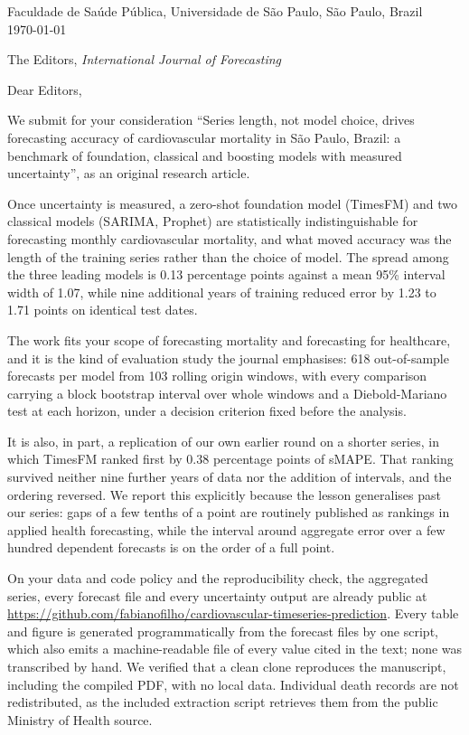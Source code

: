 \documentclass[11pt]{article}
\begin{document}
\noindent
Faculdade de Sa\'ude P\'ublica, Universidade de S\~ao Paulo, S\~ao Paulo, Brazil \\
\today

\vspace{1em}
\noindent
The Editors, \emph{International Journal of Forecasting}

\vspace{1em}

\noindent Dear Editors,

\vspace{0.6em}

We submit for your consideration ``Series length, not model choice, drives forecasting
accuracy of cardiovascular mortality in S\~ao Paulo, Brazil: a benchmark of foundation,
classical and boosting models with measured uncertainty'', as an original research article.

Once uncertainty is measured, a zero-shot foundation model (TimesFM) and two classical
models (SARIMA, Prophet) are statistically indistinguishable for forecasting monthly
cardiovascular mortality, and what moved accuracy was the length of the training series
rather than the choice of model. The spread among the three leading models is 0.13
percentage points against a mean 95\% interval width of 1.07, while nine additional years
of training reduced error by 1.23 to 1.71 points on identical test dates.

The work fits your scope of forecasting mortality and forecasting for healthcare, and it is
the kind of evaluation study the journal emphasises: 618 out-of-sample forecasts per model
from 103 rolling origin windows, with every comparison carrying a block bootstrap interval
over whole windows and a Diebold-Mariano test at each horizon, under a decision criterion
fixed before the analysis.

It is also, in part, a replication of our own earlier round on a shorter series, in which
TimesFM ranked first by 0.38 percentage points of sMAPE. That ranking survived neither nine
further years of data nor the addition of intervals, and the ordering reversed. We report
this explicitly because the lesson generalises past our series: gaps of a few tenths of a
point are routinely published as rankings in applied health forecasting, while the interval
around aggregate error over a few hundred dependent forecasts is on the order of a full
point.

On your data and code policy and the reproducibility check, the aggregated series, every
forecast file and every uncertainty output are already public at
\url{https://github.com/fabianofilho/cardiovascular-timeseries-prediction}. Every table and
figure is generated programmatically from the forecast files by one script, which also
emits a machine-readable file of every value cited in the text; none was transcribed by
hand. We verified that a clean clone reproduces the manuscript, including the compiled PDF,
with no local data. Individual death records are not redistributed, as the included
extraction script retrieves them from the public Ministry of Health source.
\end{document}
